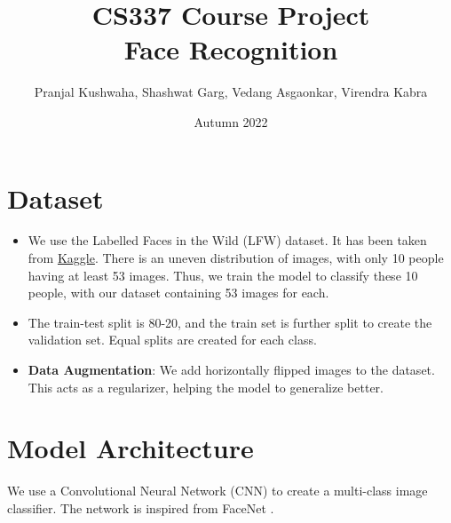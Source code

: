 \documentclass{article}
\title{\textbf{CS337 Course Project \\ Face Recognition}}
\author{Pranjal Kushwaha, Shashwat Garg, Vedang Asgaonkar, Virendra Kabra}
\date{Autumn 2022}
\newcommand{\B}[1]{\textbf{#1}}
\begin{document}
\begin{sloppypar}       %

    \maketitle
    \tableofcontents

    \newpage

    \section{Dataset}
    
        \begin{itemize}
            \item We use the Labelled Faces in the Wild (LFW) dataset. It has been taken from \href{https://www.kaggle.com/datasets/jessicali9530/lfw-dataset}{Kaggle}. There is an uneven distribution of images, with only 10 people having at least 53 images. Thus, we train the model to classify these 10 people, with our dataset containing 53 images for each.
            \item The train-test split is 80-20, and the train set is further split to create the validation set. Equal splits are created for each class.
            \item \B{Data Augmentation}: We add horizontally flipped images to the dataset. This acts as a regularizer, helping the model to generalize better.
        \end{itemize}
    

    \section{Model Architecture}

        We use a Convolutional Neural Network (CNN) to create a multi-class image classifier. The network is inspired from FaceNet \cite{facenet}.


\end{sloppypar}
\end{document}
